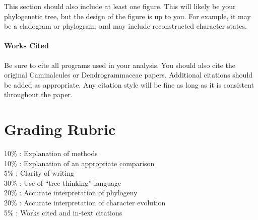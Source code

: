 \documentclass[12pt]{article}
\begin{document}
This section should also include at least one figure.
This will likely be your phylogenetic tree, but the design of the figure is up to you. 
For example, it may be a cladogram or phylogram, and may include reconstructed character states.

\paragraph{Works Cited}
Be sure to cite all programs used in your analysis. 
You should also cite the original Caminalcules or Dendrogrammaceae papers.
Additional citations should be added as appropriate. 
Any citation style will be fine as long as it is consistent throughout the paper.


\section{Grading Rubric}

10\% : Explanation of methods\\
10\% : Explanation of an appropriate comparison\\
5\% : Clarity of writing\\
30\% : Use of ``tree thinking'' language\\
20\% : Accurate interpretation of phylogeny\\
20\% : Accurate interpretation of character evolution\\
5\% : Works cited and in-text citations\\
\end{document}
